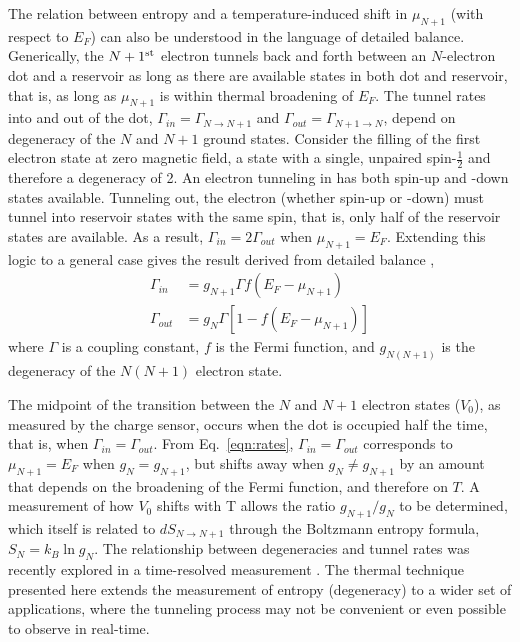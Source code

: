 \documentclass[twocolumn,showpacs,preprintnumbers,amsmath,amssymb,pra,aps,superscriptaddress]{revtex4-1}
\begin{document}
The relation between entropy and a temperature-induced shift in $\mu_{N+1}$ (with respect to $E_F$) can also be understood in the language of detailed balance.   Generically, the $N+1^{\rm st}$ electron tunnels back and forth between an $N$-electron dot and a reservoir as long as there are available states in both dot and reservoir, that is, as long as $\mu_{N+1}$ is within thermal broadening of $E_F$.  The tunnel rates into and out of the dot, $\Gamma_{in}=\Gamma_{N\rightarrow N+1}$ and $\Gamma_{out}=\Gamma_{N+1\rightarrow N}$, depend on degeneracy of the $N$ and $N+1$ ground states.  Consider the filling of the first electron state at zero magnetic field, a state with a single, unpaired spin-$\frac{1}{2}$ and therefore a degeneracy of 2. An electron tunneling in has both spin-up and -down states available.  Tunneling out, the electron (whether spin-up or -down) must tunnel into reservoir states with the same spin, that is, only half of the reservoir states are available. As a result, $\Gamma_{in} = 2\Gamma_{out}$ when $\mu_{N+1}=E_F$. Extending this logic to a general case gives the result derived from detailed balance \cite{Gustavsson2009}, 
%
\begin{align}
	\Gamma_{in} &=  g_{N+1} \Gamma f(E_F - \mu_{N+1}) \label{eqn:rates}\\
	\Gamma_{out} &= g_{N} \Gamma [1 - f(E_F - \mu_{N+1})] \nonumber
\end{align}
%
where $\Gamma$ is a coupling constant, $f$ is the Fermi function, and $g_{N(N+1)}$ is the degeneracy of the $N(N+1)$ electron state.

The midpoint of the transition between the $N$ and $N+1$ electron states ($V_0$), as measured by the charge sensor, occurs when the dot is occupied half the time, that is, when $\Gamma_{in} = \Gamma_{out}$. From Eq.~\ref{eqn:rates}, $\Gamma_{in} = \Gamma_{out}$ corresponds to $\mu_{N+1} = E_F$ when $g_{N}=g_{N+1}$, but shifts away when $g_{N}\neq g_{N+1}$ by an amount that depends on the broadening of the Fermi function, and therefore on $T$.   A measurement of how $V_0$ shifts with T allows the ratio $g_{N+1}/g_{N}$ to be determined, which itself is related to $dS_{N\rightarrow N+1}$ through the Boltzmann entropy formula, $S_{N}=k_{B} \ln{g_N}$.  The relationship between degeneracies and tunnel rates was recently explored in a time-resolved measurement \cite{Hofmann2016}.  The thermal technique presented here extends the measurement of entropy (degeneracy) to a wider set of applications, where the tunneling process may not be convenient or even possible to observe in real-time.
\end{document}
